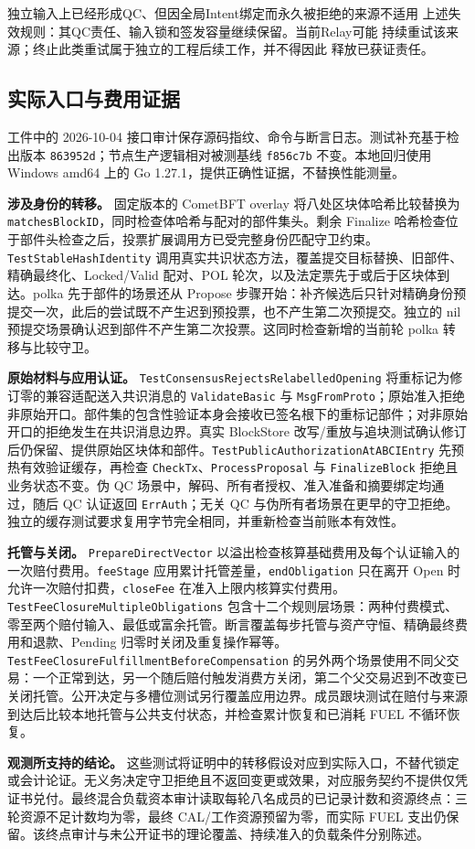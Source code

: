 独立输入上已经形成QC、但因全局Intent绑定而永久被拒绝的来源不适用
上述失效规则：其QC责任、输入锁和签发容量继续保留。当前Relay可能
持续重试该来源；终止此类重试属于独立的工程后续工作，并不得因此
释放已获证责任。

\subsection{实际入口与费用证据}
\label{supp:interface-fee-evidence}
工件中的 2026-10-04 接口审计保存源码指纹、命令与断言日志。测试补充基于检出版本 \texttt{863952d}；节点生产逻辑相对被测基线 \texttt{f856c7b} 不变。本地回归使用 Windows amd64 上的 Go 1.27.1，提供正确性证据，不替换性能测量。

\noindent\textbf{涉及身份的转移。}
固定版本的 CometBFT overlay 将八处区块体哈希比较替换为 \texttt{matches\allowbreak BlockID}，同时检查体哈希与配对的部件集头。剩余 Finalize 哈希检查位于部件头检查之后，投票扩展调用方已受完整身份匹配守卫约束。\texttt{Test\allowbreak Stable\allowbreak Hash\allowbreak Identity} 调用真实共识状态方法，覆盖提交目标替换、旧部件、精确最终化、Locked/Valid 配对、POL 轮次，以及法定票先于或后于区块体到达。polka 先于部件的场景还从 Propose 步骤开始：补齐候选后只针对精确身份预提交一次，此后的尝试既不产生迟到预投票，也不产生第二次预提交。独立的 nil 预提交场景确认迟到部件不产生第二次投票。这同时检查新增的当前轮 polka 转移与比较守卫。

\noindent\textbf{原始材料与应用认证。}
\texttt{Test\allowbreak Consensus\allowbreak Rejects\allowbreak Relabelled\allowbreak Opening} 将重标记为修订零的兼容适配送入共识消息的 \texttt{Validate\allowbreak Basic} 与 \texttt{Msg\allowbreak From\allowbreak Proto}；原始准入拒绝非原始开口。部件集的包含性验证本身会接收已签名根下的重标记部件；对非原始开口的拒绝发生在共识消息边界。真实 BlockStore 改写/重放与追块测试确认修订后仍保留、提供原始区块体和部件。\texttt{Test\allowbreak Public\allowbreak Authorization\allowbreak At\allowbreak ABCIEntry} 先预热有效验证缓存，再检查 \texttt{CheckTx}、\texttt{ProcessProposal} 与 \texttt{FinalizeBlock} 拒绝且业务状态不变。伪 QC 场景中，解码、所有者授权、准入准备和摘要绑定均通过，随后 QC 认证返回 \texttt{ErrAuth}；无关 QC 与伪所有者场景在更早的守卫拒绝。独立的缓存测试要求复用字节完全相同，并重新检查当前账本有效性。

\noindent\textbf{托管与关闭。}
\texttt{PrepareDirectVector} 以溢出检查核算基础费用及每个认证输入的一次赔付费用。\texttt{feeStage} 应用累计托管差量，\texttt{endObligation} 只在离开 Open 时允许一次赔付扣费，\texttt{closeFee} 在准入上限内核算实付费用。\texttt{Test\allowbreak Fee\allowbreak Closure\allowbreak Multiple\allowbreak Obligations} 包含十二个规则层场景：两种付费模式、零至两个赔付输入、最低或富余托管。断言覆盖每步托管与资产守恒、精确最终费用和退款、Pending 归零时关闭及重复操作幂等。\texttt{Test\allowbreak Fee\allowbreak Closure\allowbreak Fulfillment\allowbreak Before\allowbreak Compensation} 的另外两个场景使用不同父交易：一个正常到达，另一个随后赔付触发消费方关闭，第二个父交易迟到不改变已关闭托管。公开决定与多槽位测试另行覆盖应用边界。成员跟块测试在赔付与来源到达后比较本地托管与公共支付状态，并检查累计恢复和已消耗 FUEL 不循环恢复。

\noindent\textbf{观测所支持的结论。}
这些测试将证明中的转移假设对应到实际入口，不替代锁定或会计论证。无义务决定守卫拒绝且不返回变更或效果，对应服务契约不提供仅凭证书兑付。最终混合负载资本审计读取每轮八名成员的已记录计数和资源终点：三轮资源不足计数均为零，最终 CAL/工作资源预留为零，而实际 FUEL 支出仍保留。该终点审计与未公开证书的理论覆盖、持续准入的负载条件分别陈述。
